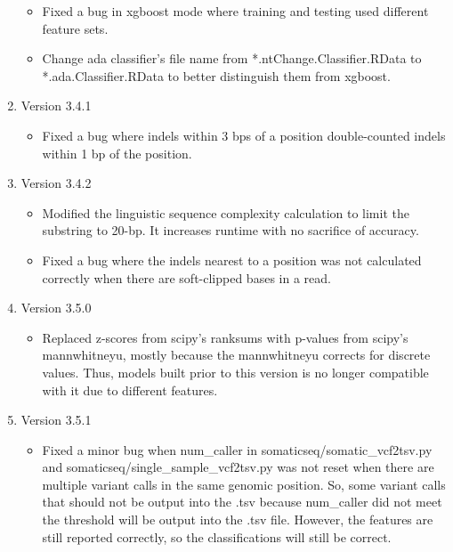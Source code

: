 \documentclass[10pt,letterpaper]{article}
\begin{document}
\begin{sloppypar}
\begin{enumerate}
\begin{itemize}
            \item Fixed a bug in xgboost mode where training and testing used different feature sets. 

            \item Change ada classifier's file name from *.ntChange.Classifier.RData to *.ada.Classifier.RData to better distinguish them from xgboost. 
		
		\end{itemize}

		
	\item Version 3.4.1
	
		\begin{itemize}
            \item Fixed a bug where indels within 3 bps of a position double-counted indels within 1 bp of the position.
		
		\end{itemize}


	\item Version 3.4.2

        \begin{itemize}
            \item Modified the linguistic sequence complexity calculation to limit the substring to 20-bp. It increases runtime with no sacrifice of accuracy.

            \item Fixed a bug where the indels nearest to a position was not calculated correctly when there are soft-clipped bases in a read.

		\end{itemize}


	\item Version 3.5.0

        \begin{itemize}
            \item Replaced z-scores from scipy's ranksums with p-values from scipy's mannwhitneyu, mostly because the mannwhitneyu corrects for discrete values. Thus, models built prior to this version is no longer compatible with it due to different features. 
		\end{itemize}


	\item Version 3.5.1

        \begin{itemize}
            \item Fixed a minor bug when num\_caller in somaticseq/somatic\_vcf2tsv.py and somaticseq/single\_sample\_vcf2tsv.py was not reset when there are multiple variant calls in the same genomic position. So, some variant calls that should not be output into the .tsv because num\_caller did not meet the threshold will be output into the .tsv file. However, the features are still reported correctly, so the classifications will still be correct. 


\end{itemize}
\end{enumerate}
\end{sloppypar}
\end{document}
